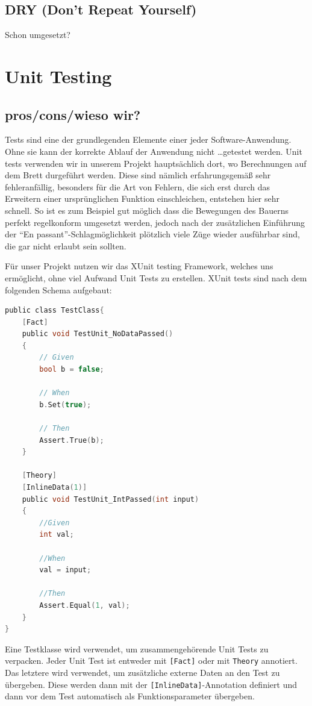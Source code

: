 \documentclass[
10pt, %
a4paper, %
oneside, %
headinclude,footinclude, %
BCOR5mm, %
]{scrartcl}
\begin{document}
\subsection{DRY (Don't Repeat Yourself)}
Schon umgesetzt?


\section{Unit Testing}
\subsection{pros/cons/wieso wir?}
Tests sind eine der grundlegenden Elemente einer jeder Software-Anwendung. Ohne sie kann der korrekte Ablauf der Anwendung nicht \dots getestet werden. Unit tests verwenden wir in unserem Projekt hauptsächlich dort, wo Berechnungen auf dem Brett durgeführt werden. Diese sind nämlich erfahrungsgemäß sehr fehleranfällig, besonders für die Art von Fehlern, die sich erst durch das Erweitern einer ursprünglichen Funktion einschleichen, entstehen hier sehr schnell. So ist es zum Beispiel gut möglich dass die Bewegungen des Bauerns perfekt regelkonform umgesetzt werden, jedoch nach der zusätzlichen Einführung der \enquote{En passant}-Schlagmöglichkeit plötzlich viele Züge wieder ausführbar sind, die gar nicht erlaubt sein sollten.

Für unser Projekt nutzen wir das XUnit testing Framework, welches uns ermöglicht, ohne viel Aufwand Unit Tests zu erstellen.
XUnit tests sind nach dem folgenden Schema aufgebaut:
\begin{lstlisting}[language=c, style=mStyle]
public class TestClass{
	[Fact]
	public void TestUnit_NoDataPassed()
	{
		// Given
		bool b = false;

		// When
		b.Set(true);

		// Then
		Assert.True(b);
	}

	[Theory]
	[InlineData(1)]
	public void TestUnit_IntPassed(int input)
	{
		//Given
		int val;

		//When
		val = input;

		//Then
		Assert.Equal(1, val);
	}
}
\end{lstlisting}

Eine Testklasse wird verwendet, um zusammengehörende Unit Tests zu verpacken. Jeder Unit Test ist entweder mit \texttt{[Fact]} oder mit \texttt{Theory} annotiert. Das letztere wird verwendet, um zusätzliche externe Daten an den Test zu übergeben. Diese werden dann mit der \texttt{[InlineData]}-Annotation definiert und dann vor dem Test automatisch als Funktionsparameter übergeben.
\end{document}
